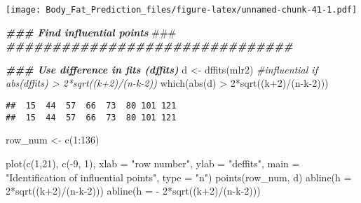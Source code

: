\documentclass[
]{article}
\newenvironment{Shaded}{\begin{snugshade}}{\end{snugshade}}
\newcommand{\AlertTok}[1]{\textcolor[rgb]{0.94,0.16,0.16}{#1}}
\newcommand{\AttributeTok}[1]{\textcolor[rgb]{0.77,0.63,0.00}{#1}}
\newcommand{\CommentTok}[1]{\textcolor[rgb]{0.56,0.35,0.01}{\textit{#1}}}
\newcommand{\DecValTok}[1]{\textcolor[rgb]{0.00,0.00,0.81}{#1}}
\newcommand{\DocumentationTok}[1]{\textcolor[rgb]{0.56,0.35,0.01}{\textbf{\textit{#1}}}}
\newcommand{\FunctionTok}[1]{\textcolor[rgb]{0.00,0.00,0.00}{#1}}
\newcommand{\NormalTok}[1]{#1}
\newcommand{\OtherTok}[1]{\textcolor[rgb]{0.56,0.35,0.01}{#1}}
\newcommand{\SpecialCharTok}[1]{\textcolor[rgb]{0.00,0.00,0.00}{#1}}
\newcommand{\StringTok}[1]{\textcolor[rgb]{0.31,0.60,0.02}{#1}}
\begin{document}
\texttt{[image: Body\_Fat\_Prediction\_files/figure-latex/unnamed-chunk-41-1.pdf]}

\begin{Shaded}
\begin{Highlighting}[]
\DocumentationTok{\#\#\# Find influential points }\AlertTok{\#\#\#}
\DocumentationTok{\#\#\#\#\#\#\#\#\#\#\#\#\#\#\#\#\#\#\#\#\#\#\#\#\#\#\#\#\#\#\#}

\DocumentationTok{\#\#\# Use difference in fits (dffits)}
\NormalTok{d }\OtherTok{\textless{}{-}} \FunctionTok{dffits}\NormalTok{(mlr2) }\CommentTok{\#influential if abs(dffits) \textgreater{} 2*sqrt((k+2)/(n{-}k{-}2))}
\FunctionTok{which}\NormalTok{(}\FunctionTok{abs}\NormalTok{(d) }\SpecialCharTok{\textgreater{}} \DecValTok{2}\SpecialCharTok{*}\FunctionTok{sqrt}\NormalTok{((k}\SpecialCharTok{+}\DecValTok{2}\NormalTok{)}\SpecialCharTok{/}\NormalTok{(n}\SpecialCharTok{{-}}\NormalTok{k}\DecValTok{{-}2}\NormalTok{)))}
\end{Highlighting}
\end{Shaded}

\begin{verbatim}
##  15  44  57  66  73  80 101 121 
##  15  44  57  66  73  80 101 121
\end{verbatim}

\begin{Shaded}
\begin{Highlighting}[]
\NormalTok{row\_num }\OtherTok{\textless{}{-}} \FunctionTok{c}\NormalTok{(}\DecValTok{1}\SpecialCharTok{:}\DecValTok{136}\NormalTok{)}
\end{Highlighting}
\end{Shaded}

\begin{Shaded}
\begin{Highlighting}[]
\FunctionTok{plot}\NormalTok{(}\FunctionTok{c}\NormalTok{(}\DecValTok{1}\NormalTok{,}\DecValTok{21}\NormalTok{), }\FunctionTok{c}\NormalTok{(}\SpecialCharTok{{-}}\DecValTok{9}\NormalTok{, }\DecValTok{1}\NormalTok{),  }\AttributeTok{xlab =} \StringTok{"row number"}\NormalTok{,}
     \AttributeTok{ylab =} \StringTok{"deffits"}\NormalTok{, }
     \AttributeTok{main =} \StringTok{"Identification of influential points"}\NormalTok{, }\AttributeTok{type =} \StringTok{"n"}\NormalTok{)}
\FunctionTok{points}\NormalTok{(row\_num, d)}
\FunctionTok{abline}\NormalTok{(}\AttributeTok{h =} \DecValTok{2}\SpecialCharTok{*}\FunctionTok{sqrt}\NormalTok{((k}\SpecialCharTok{+}\DecValTok{2}\NormalTok{)}\SpecialCharTok{/}\NormalTok{(n}\SpecialCharTok{{-}}\NormalTok{k}\DecValTok{{-}2}\NormalTok{)))}
\FunctionTok{abline}\NormalTok{(}\AttributeTok{h =} \SpecialCharTok{{-}} \DecValTok{2}\SpecialCharTok{*}\FunctionTok{sqrt}\NormalTok{((k}\SpecialCharTok{+}\DecValTok{2}\NormalTok{)}\SpecialCharTok{/}\NormalTok{(n}\SpecialCharTok{{-}}\NormalTok{k}\DecValTok{{-}2}\NormalTok{)))}
\end{Highlighting}
\end{Shaded}
\end{document}
